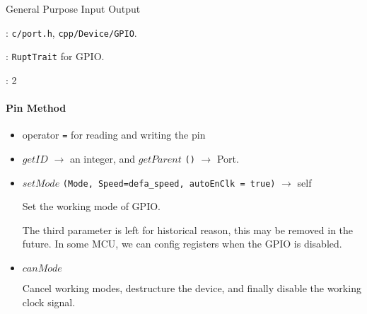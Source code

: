 
General Purpose Input Output

: \verb`c/port.h`, \verb`cpp/Device/GPIO`.

: \verb`RuptTrait` for GPIO.

: 2

\paragraph{Pin Method}
\begin{itemize}
\item operator \verb`=` for reading and writing the pin
\item $getID$ $\rightarrow$ an integer, and $getParent$ \verb`()` $\rightarrow$ {Port}.
\item $setMode$ \verb`(Mode, Speed=defa_speed, autoEnClk = true)` $\rightarrow$ self

Set the working mode of GPIO.

The third parameter is left for historical reason, this may be removed in the future. In some MCU, we can config registers when the GPIO is disabled. %

\item $canMode$

Cancel working modes, destructure the device, and finally disable the working clock signal.





\end{itemize}


